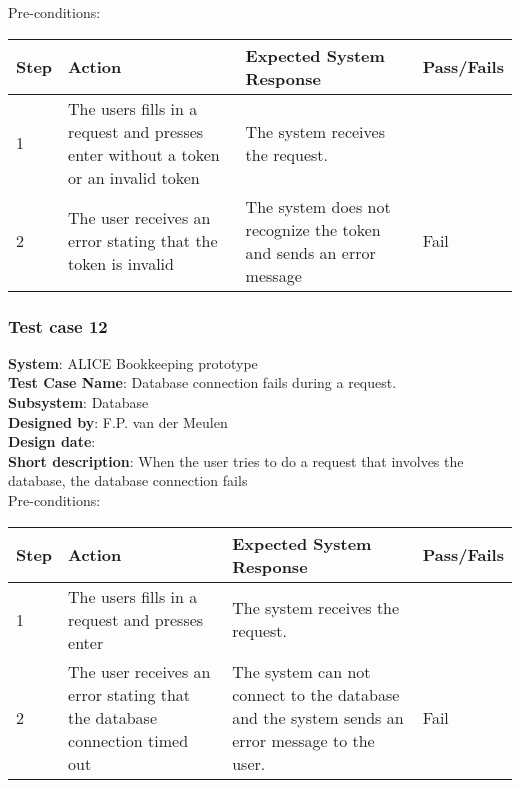 Pre-conditions: \\

\begin{longtable}{ | p{0.8cm} | p{4.5cm} | p{6cm} | p{1.5cm} |}
\hline
Step & Action & Expected System Response & Pass/Fails  \\ \hline
1 & The users fills in a request and presses enter without a token or an invalid token & The system receives the request. &  \\ \hline
2 & The user receives an error stating that the token is invalid & The system does not recognize the token and sends an error message & Fail \\ \hline
\end{longtable}
\subsubsection{Test case 12}
\textbf{System}:  ALICE Bookkeeping prototype \\
\textbf{Test Case Name}:  Database connection fails during a request. \\
\textbf{Subsystem}:  Database \\
\textbf{Designed by}:  F.P. van der Meulen\\
\textbf{Design date}:  \\
\textbf{Short description}: When the user tries to do a request that involves the database, the database connection fails \\

Pre-conditions: \\

\begin{longtable}{ | p{0.8cm} | p{4.5cm} | p{6cm} | p{1.5cm} |}
\hline
Step & Action & Expected System Response & Pass/Fails  \\ \hline
1 & The users fills in a request and presses enter  & The system receives the request. &  \\ \hline
2 & The user receives an error stating that the database connection timed out & The system can not connect to the database and the system sends an error message to the user. & Fail \\ \hline
\end{longtable}
